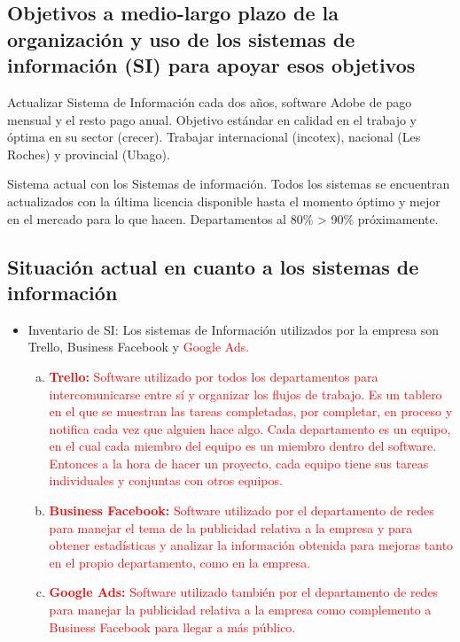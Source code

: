 \documentclass{article}
\begin{document}
\subsection{Objetivos a medio-largo plazo de la organización y uso de los sistemas de información (SI) para apoyar esos objetivos}

Actualizar Sistema de Información cada dos años, software Adobe de pago
mensual y el resto pago anual.
Objetivo estándar en calidad en el trabajo y óptima en su sector (crecer).
Trabajar internacional (incotex), nacional (Les Roches) y provincial
(Ubago).

Sistema actual con los Sistemas de información. Todos los sistemas se
encuentran actualizados con la última licencia disponible hasta el momento
óptimo y mejor en el mercado para lo que hacen.
Departamentos al 80\% \setminus> 90\% próximamente.

\subsection{Situación actual en cuanto a los sistemas de información}

\begin{itemize}
\item Inventario de SI: Los sistemas de Información utilizados por la empresa son Trello, Business Facebook y \textcolor{Red}{Google Ads.}
\begin{enumerate}[a)] 
\item \textcolor{Red}{\textbf{Trello:} Software utilizado por todos los departamentos para intercomunicarse entre sí y organizar los flujos de trabajo. Es un tablero en el que se muestran las tareas completadas, por completar, en proceso y notifica cada vez que alguien hace algo. Cada departamento es un equipo, en el cual cada miembro del equipo es un miembro dentro del software. Entonces a la hora de hacer un proyecto, cada equipo tiene sus tareas individuales y conjuntas con otros equipos.}
\item \textcolor{Red}{\textbf{Business Facebook:} Software utilizado por el departamento de redes para manejar el tema de la publicidad relativa a la empresa y para obtener estadísticas y analizar la información obtenida para mejoras tanto en el propio departamento, como en la empresa.}
\item \textcolor{Red}{\textbf{Google Ads:} Software utilizado también por el departamento de redes para manejar la publicidad relativa a la empresa como complemento a Business Facebook para llegar a más público.}
\end{enumerate}
\end{itemize}
\end{document}
